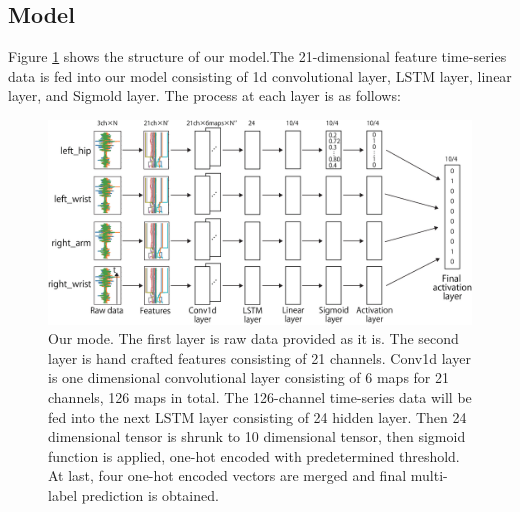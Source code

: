 \documentclass{svmult}
\begin{document}
\subsection{Model}
Figure \ref{fig:model} shows the structure of our model.The 21-dimensional feature time-series data is fed into our model consisting of 1d convolutional layer, LSTM layer, linear layer, and Sigmold layer. The process at each layer is as follows:

\begin{figure}[h]
\sidecaption[t]
\includegraphics[width=1\linewidth]{Figure_1}
\caption{Our mode. The first layer is raw data provided as it is. The second layer is hand crafted features consisting of 21 channels. Conv1d layer is one dimensional convolutional layer consisting of 6 maps for 21 channels, 126 maps in total. The 126-channel time-series data will be fed into the next LSTM layer consisting of 24 hidden layer. Then 24 dimensional tensor is shrunk to 10 dimensional tensor, then sigmoid function is applied, one-hot encoded with predetermined threshold. At last, four one-hot encoded vectors are merged and final multi-label prediction is obtained.}
\label{fig:model}
\end{figure}
\end{document}

